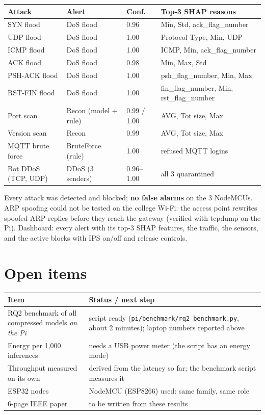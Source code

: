 \documentclass[11pt,a4paper]{article}
\newcommand{\file}[1]{\texttt{\small #1}}
\begin{document}
\begin{center}
\small\setlength{\tabcolsep}{4pt}
\begin{tabular}{llll}
\toprule
Attack & Alert & Conf. & Top-3 SHAP reasons \\
\midrule
SYN flood & DoS flood & 0.96 & Min, Std, ack\_flag\_number \\
UDP flood & DoS flood & 1.00 & Protocol Type, Min, UDP \\
ICMP flood & DoS flood & 1.00 & ICMP, Min, ack\_flag\_number \\
ACK flood & DoS flood & 0.98 & Min, Max, Std \\
PSH-ACK flood & DoS flood & 1.00 & psh\_flag\_number, Min, Max \\
RST-FIN flood & DoS flood & 1.00 & fin\_flag\_number, Min, rst\_flag\_number \\
Port scan & Recon (model + rule) & 0.99 / 1.00 & AVG, Tot size, Max \\
Version scan & Recon & 0.99 & AVG, Tot size, Max \\
MQTT brute force & BruteForce (rule) & 1.00 & refused MQTT logins \\
Bot DDoS (TCP, UDP) & DDoS (3 senders) & 0.96--1.00 & all 3 quarantined \\
\bottomrule
\end{tabular}
\end{center}

Every attack was detected and blocked; \textbf{no false alarms} on the 3 NodeMCUs. ARP spoofing could not be
tested on the college Wi-Fi: the access point rewrites spoofed ARP replies before they reach the gateway (verified
with tcpdump on the Pi). Dashboard: every alert with its top-3 SHAP features, the traffic, the sensors, and the
active blocks with IPS on/off and release controls.

\section{Open items}

\begin{center}
\begin{tabularx}{\linewidth}{P{5.2cm}L}
\toprule
Item & Status / next step \\
\midrule
RQ2 benchmark of all compressed models \emph{on the Pi} & script ready (\file{pi/benchmark/rq2\_benchmark.py},
about 2 minutes); laptop numbers reported above \\
Energy per 1,000 inferences & needs a USB power meter (the script has an energy mode) \\
Throughput measured on its own & derived from the latency so far; the benchmark script measures it \\
ESP32 nodes & NodeMCU (ESP8266) used: same family, same role \\
6-page IEEE paper & to be written from these results \\
\bottomrule
\end{tabularx}
\end{center}
\end{document}
